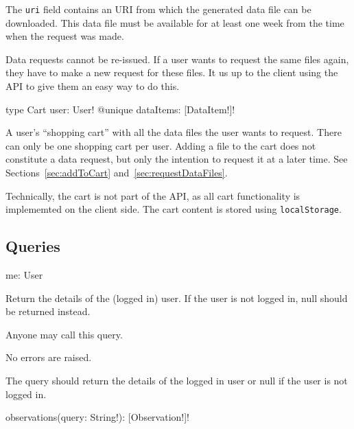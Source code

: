 The \verb|uri| field contains an URI from which the generated data file can be downloaded. This data file must be available for at least one week from the time when the request was made.

\begin{note}
Data requests cannot be re-issued. If a user wants to request the same files again, they have to make a new request for these files. It us up to the client using the API to give them an easy way to do this.
\end{note}


\begin{code}
type Cart {
  user: User! @unique
  dataItems: [DataItem!]!
}
\end{code}

A user's ``shopping cart'' with all the data files the user wants to request. There can only be one shopping cart per user. Adding a file to the cart does not constitute a data request, but only the intention to request it at a later time. See Sections~\ref{sec:addToCart} and~\ref{sec:requestDataFiles}.

\begin{note}
Technically, the cart is not part of the API, as all cart functionality is implememted on the client side. The cart content is stored using \verb|localStorage|.
\end{note}

\subsection{Queries}


\begin{code}
me: User
\end{code}

Return the details of the (logged in) user. If the user is not logged in, null should be returned instead.

\restrictions

Anyone may call this query.

\errors

No errors are raised.

\functionality

The query should return the details of the logged in user or null if the user is not logged in.


\begin{code}
observations(query: String!): [Observation!]!
\end{code}

